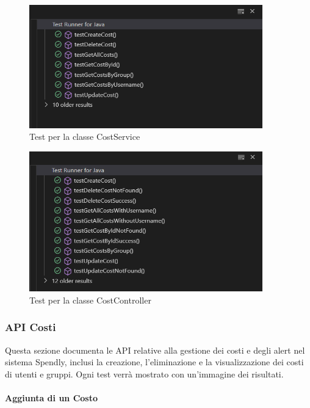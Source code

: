 \begin{figure}[H]
    \centering
    \includegraphics[width=0.9\textwidth]{images/CostServiceTest_iter2.png}
    \caption{Test per la classe CostService}
    \label{fig:CostServiceTest_iter2}
\end{figure}

\begin{figure}[H]
    \centering
    \includegraphics[width=0.9\textwidth]{images/CostControllerTest_iter2.png}
    \caption{Test per la classe CostController}
    \label{fig:CostControllerTest_iter2}
\end{figure}



\subsubsection{API Costi}

Questa sezione documenta le API relative alla gestione dei costi e degli alert  nel sistema Spendly, inclusi la creazione, l'eliminazione e la visualizzazione dei costi di utenti e gruppi. Ogni test verrà mostrato con un'immagine dei risultati.

\paragraph{Aggiunta di un Costo}  

